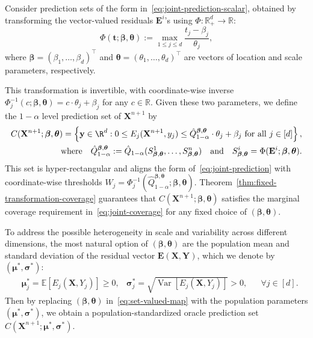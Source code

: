 Consider prediction sets of the form in~\eqref{eq:joint-prediction-scalar}, obtained by transforming the vector-valued residuals $\mathbf{E}^i$'s using $\Phi : \mathbb{R}^{d}_+ \to \mathbb{R}$:
\begin{equation}
\Phi(\mathbf t; \boldsymbol \beta, \boldsymbol \theta)
:= \max_{1 \le j \le d} \frac{t_j - \beta_j}{\theta_j},
\label{eq:residual-transformation}
\end{equation}
where $\boldsymbol \beta = (\beta_1, \ldots, \beta_d)^\top$ and $\boldsymbol \theta = (\theta_1, \ldots, \theta_d)^\top$ are vectors of location and scale parameters, respectively. 
{\color{blue}
This transformation is invertible, with coordinate-wise inverse $\Phi^{-1}_j (c; \boldsymbol \beta, \boldsymbol \theta) = c \cdot \theta_j + \beta_j$ for any $c \in \mathbb{R}$. 
Given these two parameters,  we define the $1-\alpha$ level prediction set of $\mathbf{X}^{n+1}$ by
\begin{equation}\label{eq:set-valued-map}
\begin{aligned}
C(\mathbf{X}^{n+1};\boldsymbol \beta, \boldsymbol \theta) = \left\{\mathbf y \in \R^d: 0\leq E_j(\mathbf{X}^{n+1}, y_j) \leq {\hat{Q}^{\boldsymbol{\beta},\boldsymbol{\theta}}_{1-\alpha} \cdot \theta_j + \beta_j}\text{ for all } j \in [d]\right\},\\
\text{where}\quad
\hat{Q}^{\boldsymbol{\beta},\boldsymbol{\theta}}_{1-\alpha}:= \hat{Q}_{1-\alpha}(S^1_{\boldsymbol{\beta}, \boldsymbol{\theta}},\ldots,S^n_{\boldsymbol{\beta}, \boldsymbol{\theta}})
\quad
\text{and}
\quad
S^i_{\boldsymbol{\beta}, \boldsymbol{\theta}} = \Phi(\mathbf{E}^i; \boldsymbol{\beta}, \boldsymbol{\theta}).
\end{aligned}
\end{equation}
This set is hyper-rectangular and aligns the form of~\eqref{eq:joint-prediction} with coordinate-wise thresholds $W_j = \Phi^{-1}_j (\hat{Q}^{\boldsymbol{\beta},\boldsymbol{\theta}}_{1-\alpha}; \boldsymbol \beta, \boldsymbol \theta)$.
Theorem~\ref{thm:fixed-transformation-coverage} guarantees that $C(\mathbf{X}^{n+1};\boldsymbol \beta, \boldsymbol \theta)$ satisfies the marginal coverage requirement in~\eqref{eq:joint-coverage} for any fixed choice of $(\boldsymbol \beta, \boldsymbol \theta)$.

To address the possible heterogeneity in scale and variability across different dimensions, the most natural option of $(\boldsymbol \beta, \boldsymbol \theta)$ are the population mean and standard deviation of the residual vector $\mathbf E(\mathbf X, \mathbf Y)$, which we denote by $(\boldsymbol\mu^*, \boldsymbol\sigma^*)$:
\begin{align} \label{eq:oracle-mean-std}
&\boldsymbol\mu^*_j = \mathbb{E}[E_j(\mathbf X, Y_j)] \geq 0, 
&\boldsymbol\sigma^*_j = \sqrt{\operatorname{Var}[E_j(\mathbf X, Y_j)]} > 0,
&&\forall j \in [d].
\end{align}
Then by replacing $(\boldsymbol \beta, \boldsymbol \theta)$ in~\eqref{eq:set-valued-map} with the population parameters $(\boldsymbol\mu^*, \boldsymbol\sigma^*)$, we obtain a population-standardized oracle prediction set $C(\mathbf{X}^{n+1}; \boldsymbol\mu^*, \boldsymbol\sigma^*)$. 
}

